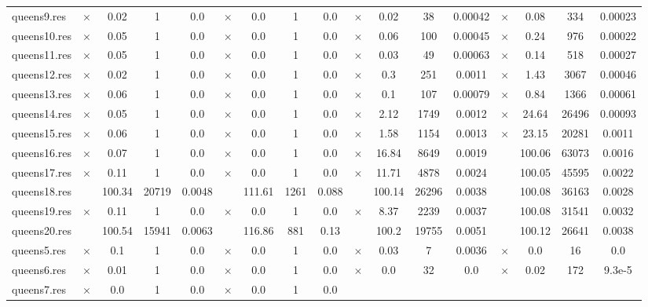 \documentclass[main.tex]{subfiles}
\begin{document}
\begin{landscape}
\begin{center}
\begin{tabular}{|l|cccc|cccc|cccc|cccc|}
\\
queens9.res & $\times$ & 0.02 & 1 & 0.0
 & $\times$ & 0.0 & 1 & 0.0
 & $\times$ & 0.02 & 38 & 0.00042
 & $\times$ & 0.08 & 334 & 0.00023
\\
queens10.res & $\times$ & 0.05 & 1 & 0.0
 & $\times$ & 0.0 & 1 & 0.0
 & $\times$ & 0.06 & 100 & 0.00045
 & $\times$ & 0.24 & 976 & 0.00022
\\
queens11.res & $\times$ & 0.05 & 1 & 0.0
 & $\times$ & 0.0 & 1 & 0.0
 & $\times$ & 0.03 & 49 & 0.00063
 & $\times$ & 0.14 & 518 & 0.00027
\\
queens12.res & $\times$ & 0.02 & 1 & 0.0
 & $\times$ & 0.0 & 1 & 0.0
 & $\times$ & 0.3 & 251 & 0.0011
 & $\times$ & 1.43 & 3067 & 0.00046
\\
queens13.res & $\times$ & 0.06 & 1 & 0.0
 & $\times$ & 0.0 & 1 & 0.0
 & $\times$ & 0.1 & 107 & 0.00079
 & $\times$ & 0.84 & 1366 & 0.00061
\\
queens14.res & $\times$ & 0.05 & 1 & 0.0
 & $\times$ & 0.0 & 1 & 0.0
 & $\times$ & 2.12 & 1749 & 0.0012
 & $\times$ & 24.64 & 26496 & 0.00093
\\
queens15.res & $\times$ & 0.06 & 1 & 0.0
 & $\times$ & 0.0 & 1 & 0.0
 & $\times$ & 1.58 & 1154 & 0.0013
 & $\times$ & 23.15 & 20281 & 0.0011
\\
queens16.res & $\times$ & 0.07 & 1 & 0.0
 & $\times$ & 0.0 & 1 & 0.0
 & $\times$ & 16.84 & 8649 & 0.0019
 &  & 100.06 & 63073 & 0.0016
\\
queens17.res & $\times$ & 0.11 & 1 & 0.0
 & $\times$ & 0.0 & 1 & 0.0
 & $\times$ & 11.71 & 4878 & 0.0024
 &  & 100.05 & 45595 & 0.0022
\\
queens18.res &  & 100.34 & 20719 & 0.0048
 &  & 111.61 & 1261 & 0.088
 &  & 100.14 & 26296 & 0.0038
 &  & 100.08 & 36163 & 0.0028
\\
queens19.res & $\times$ & 0.11 & 1 & 0.0
 & $\times$ & 0.0 & 1 & 0.0
 & $\times$ & 8.37 & 2239 & 0.0037
 &  & 100.08 & 31541 & 0.0032
\\
queens20.res &  & 100.54 & 15941 & 0.0063
 &  & 116.86 & 881 & 0.13
 &  & 100.2 & 19755 & 0.0051
 &  & 100.12 & 26641 & 0.0038
\\
queens5.res & $\times$ & 0.1 & 1 & 0.0
 & $\times$ & 0.0 & 1 & 0.0
 & $\times$ & 0.03 & 7 & 0.0036
 & $\times$ & 0.0 & 16 & 0.0
\\
queens6.res & $\times$ & 0.01 & 1 & 0.0
 & $\times$ & 0.0 & 1 & 0.0
 & $\times$ & 0.0 & 32 & 0.0
 & $\times$ & 0.02 & 172 & 9.3e-5
\\
queens7.res & $\times$ & 0.0 & 1 & 0.0
 & $\times$ & 0.0 & 1 & 0.0

\end{tabular}
\end{center}
\end{landscape}
\end{document}
